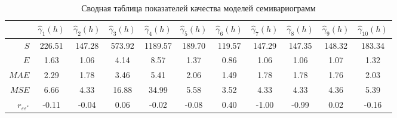 \begin{table}[ht]
\centering
\caption{Сводная таблица показателей качества моделей семивариограмм} 
\label{table:summary-cv}
\begingroup\footnotesize
\begin{tabular}{r|cccccccccc}
  \hline
 & $ \widehat{\gamma}_1(h) $ & $ \widehat{\gamma}_2(h) $ & $ \widehat{\gamma}_3(h) $ & $ \widehat{\gamma}_4(h) $ & $ \widehat{\gamma}_5(h) $ & $ \widehat{\gamma}_6(h) $ & $ \widehat{\gamma}_7(h) $ & $ \widehat{\gamma}_8(h) $ & $ \widehat{\gamma}_9(h) $ & $ \widehat{\gamma}_{10}(h) $ \\ 
  \hline
$ S $ & 226.51 & 147.28 & 573.92 & 1189.57 & 189.70 & 119.57 & 147.29 & 147.35 & 148.32 & 183.34 \\ 
  $ E $ & 1.63 & 1.06 & 4.14 & 8.57 & 1.37 & 0.86 & 1.06 & 1.06 & 1.07 & 1.32 \\ 
  $ MAE $ & 2.29 & 1.78 & 3.46 & 5.41 & 2.06 & 1.49 & 1.78 & 1.78 & 1.76 & 2.03 \\ 
  $ MSE $ & 6.66 & 4.33 & 16.88 & 34.99 & 5.58 & 3.52 & 4.33 & 4.33 & 4.36 & 5.39 \\ 
  $ r_{\varepsilon\varepsilon^{*}} $ & -0.11 & -0.04 & 0.06 & -0.02 & -0.08 & 0.40 & -1.00 & -0.99 & 0.02 & -0.16 \\ 
   \hline
\end{tabular}
\endgroup
\end{table}
